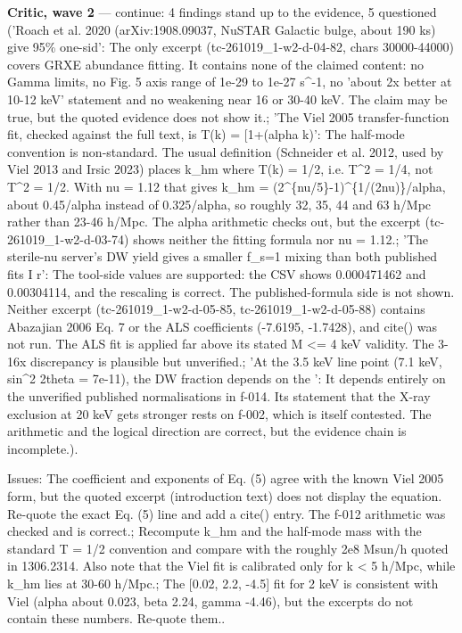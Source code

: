 \documentclass[11pt,a4paper]{article}
\begin{document}
\textbf{Critic, wave 2} --- continue: 4 findings stand up to the evidence, 5 questioned ('Roach et al. 2020 (arXiv:1908.09037, NuSTAR Galactic bulge, about 190 ks) give 95\% one-sid': The only excerpt (tc-261019\_1-w2-d-04-82, chars 30000-44000) covers GRXE abundance fitting. It contains none of the claimed content: no Gamma limits, no Fig. 5 axis range of 1e-29 to 1e-27 s\textasciicircum{}-1, no 'about 2x better at 10-12 keV' statement and no weakening near 16 or 30-40 keV. The claim may be true, but the quoted evidence does not show it.; 'The Viel 2005 transfer-function fit, checked against the full text, is T(k) = [1+(alpha k)': The half-mode convention is non-standard. The usual definition (Schneider et al. 2012, used by Viel 2013 and Irsic 2023) places k\_hm where T(k) = 1/2, i.e. T\textasciicircum{}2 = 1/4, not T\textasciicircum{}2 = 1/2. With nu = 1.12 that gives k\_hm = (2\textasciicircum{}\{nu/5\}-1)\textasciicircum{}\{1/(2nu)\}/alpha, about 0.45/alpha instead of 0.325/alpha, so roughly 32, 35, 44 and 63 h/Mpc rather than 23-46 h/Mpc. The alpha arithmetic checks out, but the excerpt (tc-261019\_1-w2-d-03-74) shows neither the fitting formula nor nu = 1.12.; 'The sterile-nu server's DW yield gives a smaller f\_s=1 mixing than both published fits I r': The tool-side values are supported: the CSV shows 0.000471462 and 0.00304114, and the rescaling is correct. The published-formula side is not shown. Neither excerpt (tc-261019\_1-w2-d-05-85, tc-261019\_1-w2-d-05-88) contains Abazajian 2006 Eq. 7 or the ALS coefficients (-7.6195, -1.7428), and cite() was not run. The ALS fit is applied far above its stated M \textless{}= 4 keV validity. The 3-16x discrepancy is plausible but unverified.; 'At the 3.5 keV line point (7.1 keV, sin\textasciicircum{}2 2theta = 7e-11), the DW fraction depends on the ': It depends entirely on the unverified published normalisations in f-014. Its statement that the X-ray exclusion at 20 keV gets stronger rests on f-002, which is itself contested. The arithmetic and the logical direction are correct, but the evidence chain is incomplete.).

Issues: The coefficient and exponents of Eq. (5) agree with the known Viel 2005 form, but the quoted excerpt (introduction text) does not display the equation. Re-quote the exact Eq. (5) line and add a cite() entry. The f-012 arithmetic was checked and is correct.; Recompute k\_hm and the half-mode mass with the standard T = 1/2 convention and compare with the roughly 2e8 Msun/h quoted in 1306.2314. Also note that the Viel fit is calibrated only for k \textless{} 5 h/Mpc, while k\_hm lies at 30-60 h/Mpc.; The [0.02, 2.2, -4.5] fit for 2 keV is consistent with Viel (alpha about 0.023, beta 2.24, gamma -4.46), but the excerpts do not contain these numbers. Re-quote them..
\end{document}
